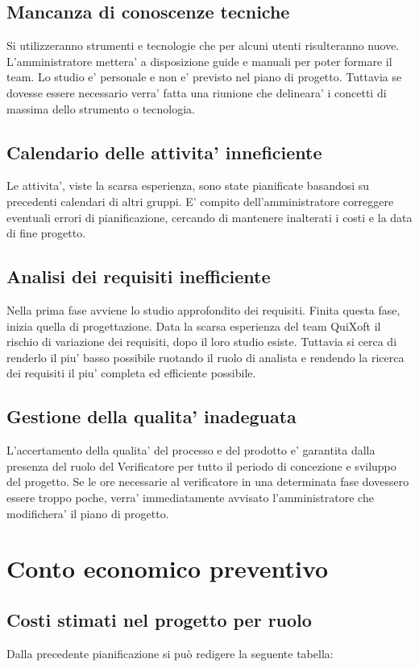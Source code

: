 \documentclass[11pt,a4paper]{article}
\begin{document}
\subsection{Mancanza di conoscenze tecniche}
Si utilizzeranno strumenti e tecnologie che per alcuni utenti risulteranno nuove.
L'amministratore mettera' a disposizione guide e manuali per poter formare il team. Lo studio e' personale e non e' previsto nel piano di progetto. Tuttavia se dovesse essere necessario verra' fatta una riunione che delineara' i concetti di massima dello strumento o tecnologia.   
\subsection{Calendario delle attivita' inneficiente}
Le attivita', viste la scarsa esperienza, sono state pianificate basandosi su precedenti calendari di altri gruppi.
E' compito dell'amministratore correggere eventuali errori di pianificazione, cercando di mantenere inalterati i costi e la data di fine progetto.
\subsection{Analisi dei requisiti inefficiente}
Nella prima fase avviene lo studio approfondito dei requisiti. Finita questa fase, inizia quella di progettazione. Data la scarsa esperienza del team QuiXoft il rischio di variazione dei requisiti, dopo il loro studio esiste. Tuttavia si cerca di renderlo il piu' basso possibile ruotando il ruolo di analista e rendendo la ricerca dei requisiti il piu' completa ed efficiente possibile.
\subsection{Gestione della qualita' inadeguata}
L'accertamento della qualita' del processo e del prodotto e' garantita dalla presenza del ruolo del Verificatore per tutto il periodo di concezione e sviluppo del progetto. Se le ore necessarie al verificatore in una determinata fase dovessero essere troppo poche, verra' immediatamente avvisato l'amministratore che modifichera' il piano di progetto. 

\section{Conto economico preventivo}
\subsection{Costi stimati nel progetto per ruolo}
Dalla precedente pianificazione si può redigere la seguente tabella:\\
\end{document}
